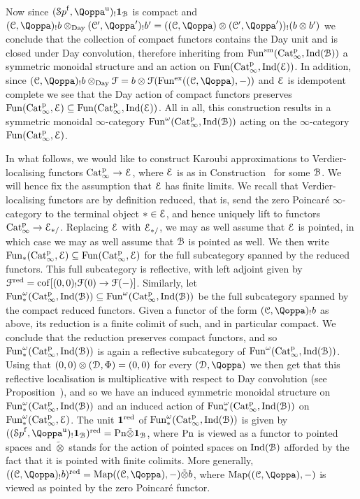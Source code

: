 \begin{construction}
Now since $(\Spaf,\QF^{\uni})_!\one_{\cB}$ is compact and $(\C,\QF)_!b \otimes_{\Day} (\C',\QF')_!b' = ((\C,\QF)\otimes(\C',\QF'))_!(b\otimes b')$ we conclude that the collection of compact functors contains the Day unit and is closed under Day convolution, therefore inheriting from $\operatorname{Fun}^{\mathrm{sm}}(\mathrm{Cat}^{\mathrm p}_\infty,\operatorname{Ind}(\mathcal{B}))$ a symmetric monoidal structure and an action on $\operatorname{Fun}(\mathrm{Cat}^{\mathrm p}_\infty,\operatorname{Ind}(\mathcal{E}))$. In addition, since $(\C,\QF)_!b \otimes_{\Day} \F = b\otimes \F(\Funx((\C,\QF),-))$ and $\mathcal{E}$ is idempotent complete we see that the Day action of compact functors preserves $\operatorname{Fun}(\mathrm{Cat}^{\mathrm p}_\infty,\mathcal{E}) \subseteq \operatorname{Fun}(\mathrm{Cat}^{\mathrm p}_\infty,\operatorname{Ind}(\mathcal{E}))$. All in all, this construction results in a symmetric monoidal $\infty$-category $\operatorname{Fun}^{\omega}(\mathrm{Cat}^{\mathrm p}_\infty,\operatorname{Ind}(\mathcal{B}))$ acting on the $\infty$-category $\operatorname{Fun}(\mathrm{Cat}^{\mathrm p}_\infty,\mathcal{E})$.
\end{construction}


In what follows, we would like to construct Karoubi approximations to Verdier-localising functors $\mathrm{Cat}^{\mathrm p}_\infty \to \mathcal{E}$, where $\mathcal{E}$ is as in Construction~ for some $\mathcal{B}$. We will hence fix the assumption that $\mathcal{E}$ has finite limits. We recall that Verdier-localising functors are by definition reduced, that is, send the zero Poincaré $\infty$-category to the terminal object $\ast \in \mathcal{E}$, and hence uniquely lift to functors $\mathrm{Cat}^{\mathrm p}_\infty \to \mathcal{E}_{\ast/}$. Replacing $\mathcal{E}$ with $\mathcal{E}_{\ast/}$, we may as well assume that $\mathcal{E}$ is pointed, in which case we may as well assume that $\mathcal{B}$ is pointed as well. 
We then write $\operatorname{Fun}_{\ast}(\mathrm{Cat}^{\mathrm p}_\infty,\mathcal{E}) \subseteq \operatorname{Fun}(\mathrm{Cat}^{\mathrm p}_\infty,\mathcal{E})$ for the full subcategory spanned by the reduced functors.
This full subcategory is reflective, with left adjoint given by $\mathcal{F}^{\mathrm{red}} = \operatorname{cof}[(0,0)_!\mathcal{F}(0) \to \mathcal{F}(-)]$. Similarly, let $\operatorname{Fun}_{\ast}^{\omega}(\mathrm{Cat}^{\mathrm p}_\infty,\operatorname{Ind}(\mathcal{B})) \subseteq \operatorname{Fun}^{\omega}(\mathrm{Cat}^{\mathrm p}_\infty,\operatorname{Ind}(\mathcal{B}))$ be the full subcategory spanned by the compact reduced functors. 
Given a functor of the form $(\C,\QF)_!b$ as above, its reduction is a finite colimit of such, and in particular compact. We conclude that the reduction preserves compact functors, and so $\operatorname{Fun}_{\ast}^{\omega}(\mathrm{Cat}^{\mathrm p}_\infty,\operatorname{Ind}(\mathcal{B}))$ is again a reflective subcategory of $\operatorname{Fun}^{\omega}(\mathrm{Cat}^{\mathrm p}_\infty,\operatorname{Ind}(\mathcal{B}))$.
Using that $(0,0) \otimes (\mathcal{D},\Phi) = (0,0)$ for every $(\D,\QF)$ we then get that this reflective localisation is multiplicative with respect to Day convolution (see Proposition~), and so we have an induced symmetric monoidal structure on $\operatorname{Fun}_{\ast}^{\omega}(\mathrm{Cat}^{\mathrm p}_\infty,\operatorname{Ind}(\mathcal{B}))$ and an induced action of $\operatorname{Fun}_{\ast}^{\omega}(\mathrm{Cat}^{\mathrm p}_\infty,\operatorname{Ind}(\mathcal{B}))$ on $\operatorname{Fun}_{\ast}^{\omega}(\mathrm{Cat}^{\mathrm p}_\infty,\mathcal{E})$. 
The unit $\mathbf{1}^{\mathrm{red}}$ of $\operatorname{Fun}_{\ast}^{\omega}(\mathrm{Cat}^{\mathrm p}_\infty,\operatorname{Ind}(\mathcal{B}))$ is given by $((\Spaf,\QF^{\uni})_!\one_{\cB})^{\red} = \Poinc \tilde{\otimes} \one_{\cB}$, where $\mathrm{Pn}$ is viewed as a functor to pointed spaces and $\tilde{\otimes}$ stands for the action of pointed spaces on $\operatorname{Ind}(\mathcal{B})$ afforded by the fact that it is pointed with finite colimits. More generally, $((\C,\QF)_!b)^{\red} = \Map((\C,\QF),-)\tilde{\otimes} b$, where $\Map((\C,\QF),-)$ is viewed as pointed by the zero Poincaré functor.


